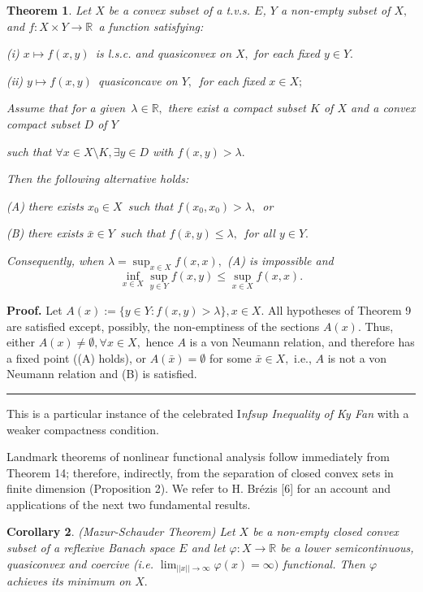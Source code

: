 \documentclass{article}
\newtheorem{theorem}{Theorem}
\newtheorem{corollary}[theorem]{Corollary}
\newenvironment{proof}[1][Proof]{\noindent\textbf{#1.} }{\ \rule{0.5em}{0.5em}}
\begin{document}
\begin{theorem}
Let $X$ be a convex subset of a t.v.s. $E$, $Y$ a non-empty subset of $X,$
and $f:X\times Y\longrightarrow 
\mathbb{R}
$\textit{\ a function satisfying:}

(i) $x\mapsto f(x,y)$\ is l.s.c. and quasiconvex on $X,$ for each fixed $%
y\in Y.$

(ii) $y\mapsto f(x,y)$\ quasiconcave on $Y,$\ for each fixed $x\in X;$

Assume that for a given\ $\lambda \in 
\mathbb{R}
,$ there exist a compact subset $K$ of $X$ and a convex compact subset $D$
of $Y$

such that $\forall x\in X\setminus K,\exists y\in D$ with $f(x,y)>\lambda .$

Then the following alternative holds:

(A) there exists $x_{0}\in X$\ such that $f(x_{0},x_{0})>\lambda ,$\ or

(B) there exists $\bar{x}\in Y$\ such that $f(\bar{x},y)\leq \lambda ,$\ for
all $y\in Y.$

Consequently, when $\lambda =\sup_{x\in X}f(x,x),$ (A) is impossible and 
\begin{equation*}
\inf_{x\in X}\sup_{y\in Y}f(x,y)\leq \sup_{x\in X}f(x,x).
\end{equation*}
\end{theorem}

\begin{proof}
Let $A(x):=\{y\in Y:f(x,y)>\lambda \},x\in X.$ All hypotheses of Theorem 9
are satisfied except, possibly, the non-emptiness of the sections $A(x).$
Thus, either $A(x)\neq \emptyset ,\forall x\in X,$ hence $A$ is a von
Neumann relation, and therefore has a fixed point ((A) holds), or $A(\bar{x}%
)=\emptyset $ for some $\bar{x}\in X,$ i.e., $A$ is not a von Neumann
relation and (B) is satisfied.
\end{proof}

This is a particular instance of the celebrated I\textit{nfsup Inequality} 
\textit{of Ky Fan} with a weaker compactness condition.

Landmark theorems of nonlinear functional analysis follow immediately from
Theorem 14; therefore, indirectly, from the separation of closed convex sets
in finite dimension (Proposition 2). We refer to H. Br\'{e}zis [6] for an
account and applications of the next two fundamental results.

\begin{corollary}
(Mazur-Schauder Theorem) Let $X$ be a non-empty closed convex subset of a
reflexive Banach space $E$ and let $\varphi :X\longrightarrow 
\mathbb{R}
$ be a lower semicontinuous, quasiconvex and coercive (i.e. $%
\lim_{||x||\rightarrow \infty }\varphi (x)=\infty )$ functional. Then $%
\varphi $ achieves its minimum on $X.$
\end{corollary}
\end{document}
